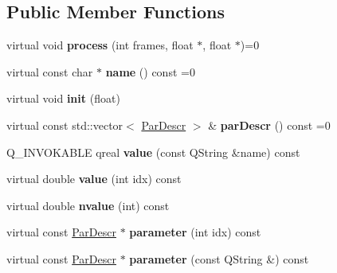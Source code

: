 \subsection*{Public Member Functions}
\begin{DoxyCompactItemize}
\item 
\mbox{\label{class_ms_1_1_effect_adc162bbec3d54f6dc41c4a8d051b0ec8}} 
virtual void {\bfseries process} (int frames, float $\ast$, float $\ast$)=0
\item 
\mbox{\label{class_ms_1_1_effect_a3c7921480e98c49c611ee0f9c2b494ba}} 
virtual const char $\ast$ {\bfseries name} () const =0
\item 
\mbox{\label{class_ms_1_1_effect_a3706c7da4de8240152cc2c9620c14e9b}} 
virtual void {\bfseries init} (float)
\item 
\mbox{\label{class_ms_1_1_effect_a4fa1b2544020864e640f0d312d1b5041}} 
virtual const std\+::vector$<$ \hyperlink{struct_ms_1_1_par_descr}{Par\+Descr} $>$ \& {\bfseries par\+Descr} () const =0
\item 
\mbox{\label{class_ms_1_1_effect_a894a2597cf31c09ca4121ea63397dd47}} 
Q\+\_\+\+I\+N\+V\+O\+K\+A\+B\+LE qreal {\bfseries value} (const Q\+String \&name) const
\item 
\mbox{\label{class_ms_1_1_effect_afa9d60d435a0ebcfde13f9a7dcc6c111}} 
virtual double {\bfseries value} (int idx) const
\item 
\mbox{\label{class_ms_1_1_effect_a172c0e759848c5c567e9a7692ea6effb}} 
virtual double {\bfseries nvalue} (int) const
\item 
\mbox{\label{class_ms_1_1_effect_a5797c5c510259fede1c7ecc5124b163a}} 
virtual const \hyperlink{struct_ms_1_1_par_descr}{Par\+Descr} $\ast$ {\bfseries parameter} (int idx) const
\item 
\mbox{\label{class_ms_1_1_effect_a14623b722bc803e63b74d00ffc0a7f64}} 
virtual const \hyperlink{struct_ms_1_1_par_descr}{Par\+Descr} $\ast$ {\bfseries parameter} (const Q\+String \&) const

\end{DoxyCompactItemize}
